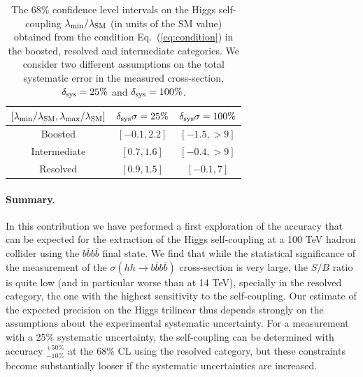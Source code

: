 \documentclass[a4paper,10pt]{article}
\newcommand{\lc}{\left[}
\newcommand{\rc}{\right]}
\begin{document}
\begin{table}[h]
  \centering
  \begin{tabular}{|c|c|c|}
    \hline
  $\lc \lambda_{\rm min}/\lambda_{\rm SM},\lambda_{\rm max}/\lambda_{\rm SM} \rc$  &  $\delta_{\rm sys}\sigma=25\%$ & $\delta_{\rm sys}\sigma=100\%$ \\
    \hline
    \hline
Boosted   & $\lc -0.1, 2.2\rc$  & $\lc -1.5, > 9\rc$  \\
\hline
Intermediate   & $\lc 0.7, 1.6\rc$  &  $\lc -0.4, > 9\rc$  \\
\hline
Resolved   & $\lc 0.9, 1.5\rc$  &  $\lc -0.1, 7\rc$  \\
\hline
  \end{tabular}
  \caption{\small \label{tab:chi2} The 68\% confidence level intervals
    on the Higgs self-coupling $\lambda_{\rm min}/\lambda_{\rm SM}$ (in units of the SM value)
    obtained from the condition
    Eq.~(\ref{eq:condition}) in the boosted, resolved and intermediate categories.
    We consider two different assumptions on the total systematic error in the measured
    cross-section,  $\delta_{\rm sys}=25\%$ and $\delta_{\rm sys}=100\%$.
  }
\end{table}
  
\paragraph{Summary.} In this contribution we have performed a first exploration of the accuracy that can be expected
for the extraction of the Higgs self-coupling at a 100 TeV hadron collider using the $b\bar{b}b\bar{b}$ final state.
%
We find that while the statistical significance of the measurement of the $\sigma(hh\to b\bar{b}b\bar{b})$ cross-section
is very large, the $S/B$ ratio is quite low (and in particular worse than at 14 TeV),
specially in the resolved category, the one with the highest sensitivity
to the self-coupling.
%
Our estimate of the expected precision on the Higgs trilinear thus depends strongly on the assumptions
about the experimental systematic uncertainty.
%
For a measurement with a 25\% systematic uncertainty, the self-coupling can be determined
with accuracy $^{+50\%}_{-10\%}$ at the 68\% CL using the resolved category, but these constraints become substantially
looser if the systematic uncertainties are increased.



\end{document}
